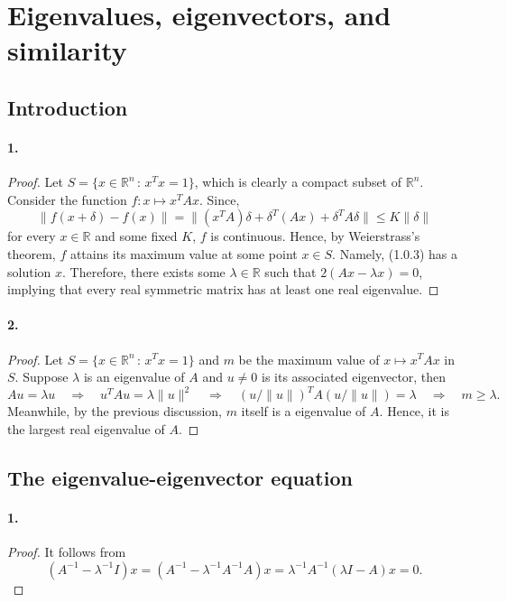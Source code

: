 \section{Eigenvalues, eigenvectors, and similarity}

\subsection{Introduction}

  \paragraph{1.}
  \begin{proof}
    Let $S=\{x\in\mathbb{R}^n\,:\,x^Tx=1\}$, which is clearly a compact subset
    of $\mathbb{R}^n$. Consider the function $f:x\mapsto x^TAx$. Since,
    \[
      \|f(x+\delta)-f(x)\| = \|(x^TA)\delta + \delta^T(Ax) + \delta^TA\delta\|
      \le K\|\delta\|
    \]
    for every $x\in\mathbb{R}$ and some fixed $K$, $f$ is continuous. Hence,
    by Weierstrass's theorem, $f$ attains its maximum value at some point $x\in 
    S$. Namely, (1.0.3) has a solution $x$. Therefore, there exists some 
    $\lambda\in\mathbb{R}$ such that $2(Ax-\lambda x)=0$, implying that every
    real symmetric matrix has at least one real eigenvalue.
  \end{proof}

  \paragraph{2.}
  \begin{proof}
    Let $S=\{x\in\mathbb{R}^n\,:\,x^Tx=1\}$ and $m$ be the maximum value of $x
    \mapsto x^TAx$ in $S$. Suppose $\lambda$ is an eigenvalue of $A$ and $u\ne0$ 
    is its associated eigenvector, then
    \[
      Au=\lambda u \quad\Rightarrow\quad 
      u^TAu=\lambda\|u\|^2 \quad\Rightarrow\quad
      (u/\|u\|)^T A (u/\|u\|) = \lambda \quad\Rightarrow\quad
      m \ge \lambda.
    \]
    Meanwhile, by the previous discussion, $m$ itself is a eigenvalue of $A$.
    Hence, it is the largest real eigenvalue of $A$.
  \end{proof}


\subsection{The eigenvalue-eigenvector equation}
  \paragraph{1.}
  \begin{proof}
    It follows from
    \[
      (A^{-1}-\lambda^{-1}I)x 
      = (A^{-1}-\lambda^{-1}A^{-1}A)x 
      = \lambda^{-1}A^{-1}(\lambda I-A)x = 0.
    \]
  \end{proof}

